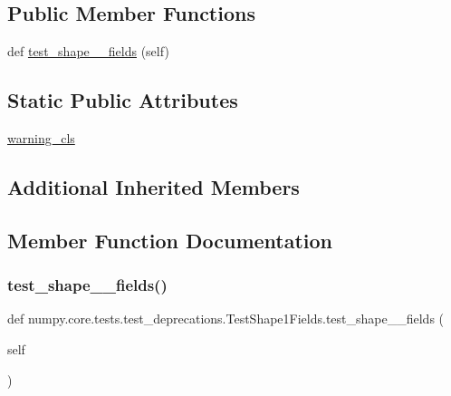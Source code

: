 \subsection*{Public Member Functions}
\begin{DoxyCompactItemize}
\item 
def \hyperlink{classnumpy_1_1core_1_1tests_1_1test__deprecations_1_1TestShape1Fields_a497b1027643712ca40f3dcacc72af692}{test\+\_\+shape\+\_\+\_\+fields} (self)
\end{DoxyCompactItemize}
\subsection*{Static Public Attributes}
\begin{DoxyCompactItemize}
\item 
\hyperlink{classnumpy_1_1core_1_1tests_1_1test__deprecations_1_1TestShape1Fields_abdfebf53cf5f0e522e182b564770b284}{warning\+\_\+cls}
\end{DoxyCompactItemize}
\subsection*{Additional Inherited Members}


\subsection{Member Function Documentation}
\mbox{\label{classnumpy_1_1core_1_1tests_1_1test__deprecations_1_1TestShape1Fields_a497b1027643712ca40f3dcacc72af692}} 
\subsubsection{\texorpdfstring{test\+\_\+shape\+\_\+\_\+fields()}{test\_shape\_1\_fields()}}
{\footnotesize\ttfamily def numpy.\+core.\+tests.\+test\+\_\+deprecations.\+Test\+Shape1\+Fields.\+test\+\_\+shape\+\_\+\_\+fields (\begin{DoxyParamCaption}\item[{}]{self }\end{DoxyParamCaption})}



